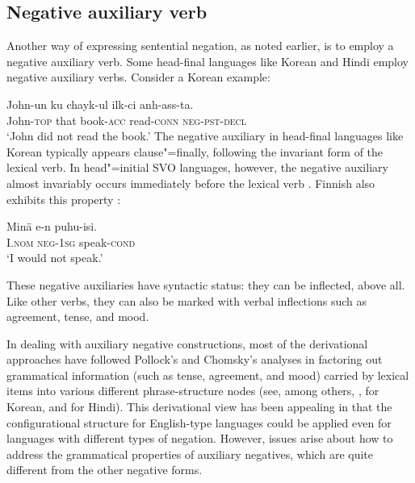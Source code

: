 \documentclass[output=paper
	        ,collection
	        ,collectionchapter
 	        ,biblatex
                ,babelshorthands
                ,newtxmath
                ,draftmode
                ,colorlinks, citecolor=brown
]{langscibook}
\begin{document}
{\begin{exe}
\begin{xlist}
\begin{exe}
\begin{xlist}
\section{Negative auxiliary verb}

Another way of expressing sentential negation, as noted earlier, is to employ
a negative auxiliary
verb. Some head-final languages like Korean and Hindi employ
negative auxiliary verbs. Consider a Korean example:

\ea
\gll John-un ku chayk-ul ilk-ci anh-ass-ta. \\
     John-\textsc{top} that book-\textsc{acc} read-\textsc{conn} \textsc{neg}-\textsc{pst}-\textsc{decl}  \\
\glt `John did not read the book.'
\z
%
%
\noindent
The negative auxiliary in head-final languages like Korean
typically appears clause"=finally, following the invariant form of the lexical verb.
In head"=initial SVO languages, however, the negative auxiliary
almost invariably occurs immediately before the lexical verb
\citep{Payne:85}. Finnish also exhibits this property \citep{Mitchell:91}:

\ea
\gll Min\"{a} e-n puhu-isi. \\
     I.\textsc{nom} \textsc{neg}-\textsc{1sg} speak-\textsc{cond} \\
\glt `I would not speak.'
\z

\noindent
These negative auxiliaries have syntactic status: they can be
inflected, above all. Like other verbs, they can also be marked
with verbal inflections such as agreement, tense, and mood.

In dealing with auxiliary negative constructions,
most of the derivational approaches have
followed Pollock's and Chomsky's analyses in factoring out grammatical
information (such as tense, agreement, and mood) carried by lexical items into various different phrase-structure nodes (see, among others, \citealt{Hagstrom:02}, \citealt{Han:07} for Korean, and \citealt{Vasishth:00} for Hindi).
This derivational view has
been appealing in that the configurational structure for English-type
languages could be applied even for languages with different types
of negation. However, issues arise about how to address the grammatical
properties of auxiliary negatives, which are quite different from the
other negative forms.
%
%
%
%


\end{xlist}
\end{exe}
\end{xlist}
\end{exe}}
\end{document}
